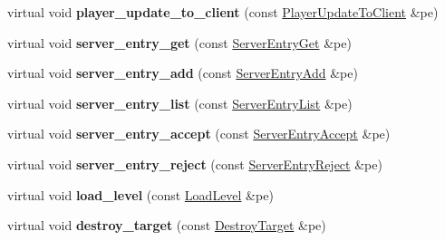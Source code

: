 \begin{DoxyCompactItemize}
\item 
\hypertarget{class_command_handler_a4038e57d46897520c478435f6b2c523a}{virtual void {\bfseries player\-\_\-update\-\_\-to\-\_\-client} (const \hyperlink{class_player_update_to_client}{Player\-Update\-To\-Client} \&pe)}\label{class_command_handler_a4038e57d46897520c478435f6b2c523a}

\item 
\hypertarget{class_command_handler_ae218cc4ddf432556c536d1199d460a08}{virtual void {\bfseries server\-\_\-entry\-\_\-get} (const \hyperlink{class_server_entry_get}{Server\-Entry\-Get} \&pe)}\label{class_command_handler_ae218cc4ddf432556c536d1199d460a08}

\item 
\hypertarget{class_command_handler_acce90c5e737c5f349f1e8e93f3e59eb2}{virtual void {\bfseries server\-\_\-entry\-\_\-add} (const \hyperlink{class_server_entry_add}{Server\-Entry\-Add} \&pe)}\label{class_command_handler_acce90c5e737c5f349f1e8e93f3e59eb2}

\item 
\hypertarget{class_command_handler_a76a5c4f33e33dea95c5cc7050f30d377}{virtual void {\bfseries server\-\_\-entry\-\_\-list} (const \hyperlink{class_server_entry_list}{Server\-Entry\-List} \&pe)}\label{class_command_handler_a76a5c4f33e33dea95c5cc7050f30d377}

\item 
\hypertarget{class_command_handler_a0d19faf20a2c40048d3faa0b5f4eca5c}{virtual void {\bfseries server\-\_\-entry\-\_\-accept} (const \hyperlink{class_server_entry_accept}{Server\-Entry\-Accept} \&pe)}\label{class_command_handler_a0d19faf20a2c40048d3faa0b5f4eca5c}

\item 
\hypertarget{class_command_handler_ad4f40da7d8732147f293f8df3b327770}{virtual void {\bfseries server\-\_\-entry\-\_\-reject} (const \hyperlink{class_server_entry_reject}{Server\-Entry\-Reject} \&pe)}\label{class_command_handler_ad4f40da7d8732147f293f8df3b327770}

\item 
\hypertarget{class_command_handler_a738593e20fa0db62aa7122384244f057}{virtual void {\bfseries load\-\_\-level} (const \hyperlink{class_load_level}{Load\-Level} \&pe)}\label{class_command_handler_a738593e20fa0db62aa7122384244f057}

\item 
\hypertarget{class_command_handler_ad43d560637d448e2280a327c79822dc1}{virtual void {\bfseries destroy\-\_\-target} (const \hyperlink{class_destroy_target}{Destroy\-Target} \&pe)}\label{class_command_handler_ad43d560637d448e2280a327c79822dc1}


\end{DoxyCompactItemize}
